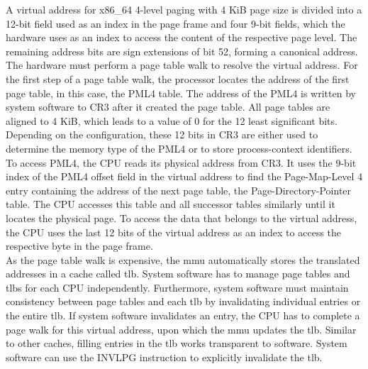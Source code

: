 A virtual address for x86\_64 4-level paging with 4 KiB page size is divided
into a 12-bit field used as an index in the page frame and four 9-bit fields,
which the hardware uses as an index to access the content of the respective page
level. The remaining address bits are sign extensions of bit 52, forming a
canonical address. The hardware must perform a page table walk to resolve the
virtual address. For the first step of a page table walk, the processor locates
the address of the first page table, in this case, the PML4 table. The address
of the PML4 is written by system software to CR3 after it created the page
table. All page tables are aligned to 4 KiB, which leads to a value of 0 for the
12 least significant bits. Depending on the configuration, these 12 bits in CR3
are either used to determine the memory type of the PML4 or to store
process-context identifiers. To access PML4, the CPU reads its physical address
from CR3. It uses the 9-bit index of the PML4 offset field in the virtual
address to find the Page-Map-Level 4 entry containing the address of the next
page table, the Page-Directory-Pointer table. The CPU accesses this table and
all successor tables similarly until it locates the physical page. To access the
data that belongs to the virtual address, the CPU uses the last 12 bits of the
virtual address as an index to access the respective byte in the page frame. \\

As the page table walk is expensive, the \gls{mmu} automatically stores the
translated addresses in a cache called \gls{tlb}. System software has to manage
page tables and \glspl{tlb} for each CPU independently. Furthermore, system
software must maintain consistency between page tables and each \gls{tlb} by
invalidating individual entries or the entire \gls{tlb}. If system software
invalidates an entry, the CPU has to complete a page walk for this virtual
address, upon which the \gls{mmu} updates the \gls{tlb}. Similar to other
caches, filling entries in the \gls{tlb} works transparent to software. System
software can use the INVLPG instruction to explicitly invalidate the \gls{tlb}.

